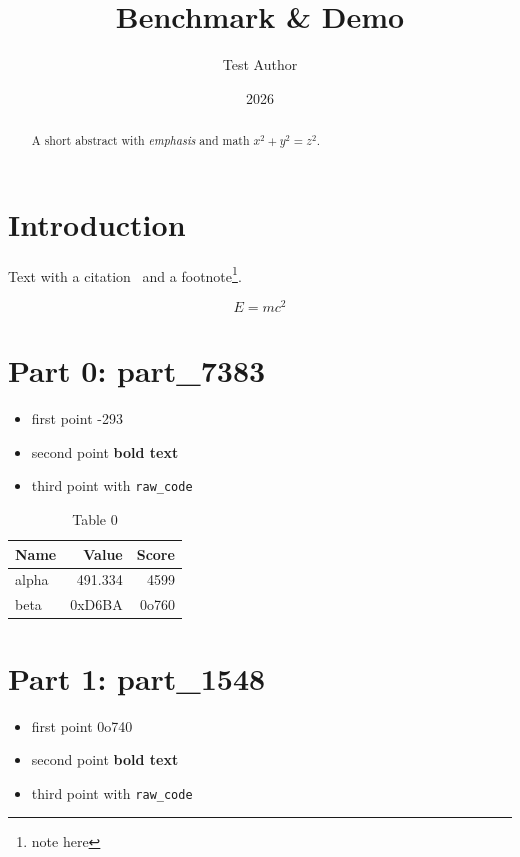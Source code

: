 \documentclass[11pt,a4paper]{article}
\title{Benchmark \& Demo}
\author{Test Author}
\date{2026}
\begin{document}
\maketitle

\begin{abstract}
A short abstract with \emph{emphasis} and math $x^2 + y^2 = z^2$.
\end{abstract}

\section{Introduction}
\label{sec:intro}

Text with a citation~\cite{knuth1984} and a footnote\footnote{note here}.

\begin{equation}
  E = mc^2
\end{equation}

\section{Part 0: part_7383}

\begin{itemize}
  \item first point -293
  \item second point \textbf{bold text}
  \item third point with \verb|raw_code|
\end{itemize}

\begin{table}[h]
  \centering
  \begin{tabular}{lrr}
    \hline
    Name & Value & Score \\ \hline
    alpha & 491.334 & 4599 \\
    beta & 0xD6BA & 0o760 \\ \hline
  \end{tabular}
  \caption{Table 0}
\end{table}

\section{Part 1: part_1548}

\begin{itemize}
  \item first point 0o740
  \item second point \textbf{bold text}
  \item third point with \verb|raw_code|
\end{itemize}
\end{document}
